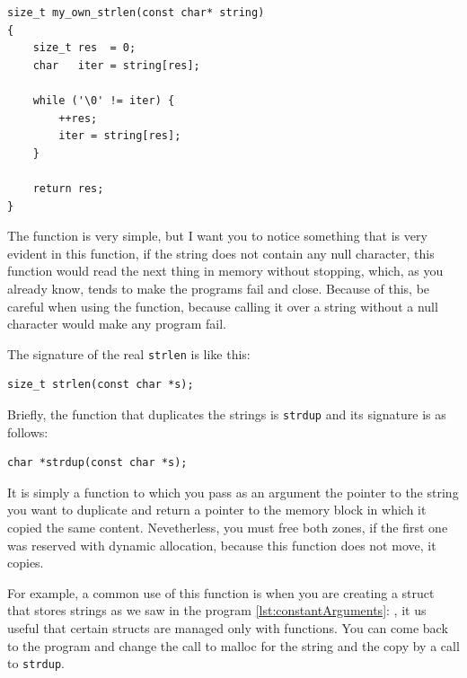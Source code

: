 \documentclass[a4paper]{article}
\begin{document}
\noindent
\begin{minipage}[H]{\linewidth}
\mbox{}
\begin{lstlisting}[style=C,
caption={Propia versión de \texttt{strlen}},
label={lst:ownStrlen}]
size_t my_own_strlen(const char* string)
{
    size_t res  = 0;
    char   iter = string[res];

    while ('\0' != iter) {
        ++res;
        iter = string[res];
    }

    return res;
}
\end{lstlisting}
\end{minipage}

The function is very simple, but I want you to notice something that is very
evident in this function, if the string does not contain any null character,
this function would read the next thing in memory without stopping, which,
as you already know, tends to make the programs fail and close. Because of this,
be careful when using the function, because calling it over a string without
a null character would make any program fail.

The signature of the real \verb!strlen! is like this:

\noindent
\begin{minipage}[H]{\linewidth}
\mbox{}
\begin{lstlisting}[style=C,
caption={Signature of function \texttt{strlen}},
label={lst:memcpy}]
size_t strlen(const char *s);
\end{lstlisting}
\end{minipage}

Briefly, the function that duplicates the strings is \verb!strdup! and its
signature is as follows:

\noindent
\begin{minipage}[H]{\linewidth}
\mbox{}
\begin{lstlisting}[style=C,
caption={Definición de \texttt{strdup}},
label={lst:ownStrlen}]
char *strdup(const char *s);
\end{lstlisting}
\end{minipage}

It is simply a function to which you pass as an argument the pointer to the
string you want to duplicate and return a pointer to the memory block in which
it copied the same content. Nevetherless, you must free both zones, if the first
one was reserved with dynamic allocation, because this function does not move,
it copies.

For example, a common use of this function is when you are creating a struct
that stores strings as we saw in the program \ref{lst:constantArguments}:
, it us useful that certain structs are managed
only with functions. You can come back to the program and change the call to
malloc for the string and the copy by a call to \verb!strdup!.
\end{document}
